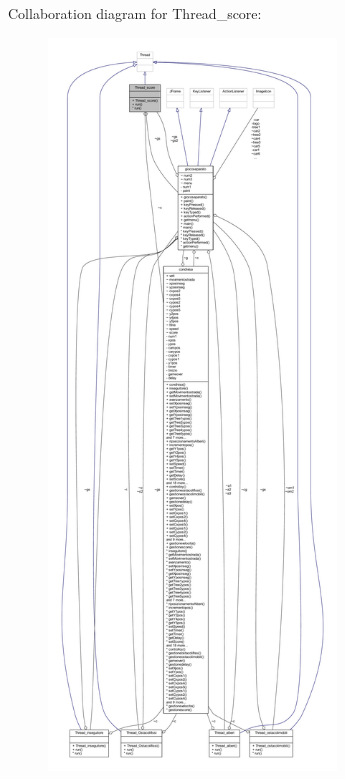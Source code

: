 Collaboration diagram for Thread\+\_\+score\+:
\nopagebreak
\begin{figure}[H]
\begin{center}
\leavevmode
\includegraphics[height=550pt]{classcargame_1_1_thread__score__coll__graph}
\end{center}
\end{figure}
